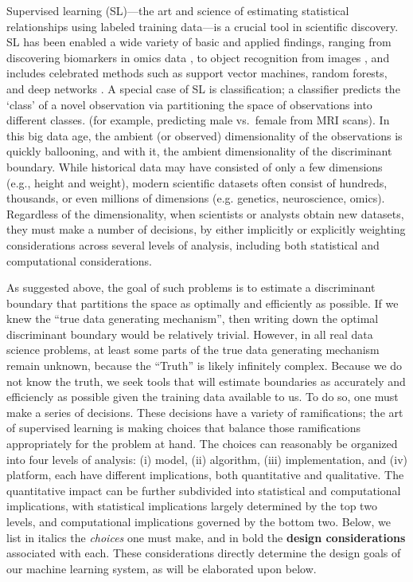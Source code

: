 \documentclass[10pt]{article}
\begin{document}
\vspace{15pt}

\clearpage
\linenumbers


Supervised learning (SL)---the art and science of estimating statistical relationships using labeled training data---is a crucial tool in scientific discovery.  SL has been enabled a wide variety of basic and applied findings, ranging from discovering biomarkers in omics data \cite{Vogelstein2014a}, to object recognition from images \cite{Krizhevsky2012}, and includes celebrated methods such as support vector machines, random forests, and deep networks \cite{Hastie2004}.  A special case of SL is classification; a classifier  predicts the `class' of a novel observation via partitioning the space of observations into different classes.
(for example, predicting male vs.~female from MRI scans).
In this big data age,  the ambient (or observed) dimensionality of the observations is quickly ballooning, and with it, the ambient dimensionality of the discriminant boundary.  While historical data may have consisted of only a few dimensions (e.g., height and weight), modern scientific datasets often consist of hundreds, thousands, or even millions of dimensions (e.g. genetics, neuroscience, omics).
Regardless of the dimensionality, when  scientists or analysts obtain new datasets, they must make a number of decisions, by either implicitly or explicitly weighting considerations across several levels of analysis, including both statistical and computational considerations.

As suggested above, the goal of such problems is to estimate a discriminant boundary that  partitions the space as optimally and efficiently  as possible. If we knew the ``true data generating mechanism'', then writing down the optimal discriminant boundary would be relatively trivial.  However, in all real data science problems, at least some parts of the true data generating mechanism remain unknown, because the ``Truth'' is likely infinitely complex.  Because we do not know the truth, we seek tools that will estimate boundaries as accurately and efficiencly as possible given the training data available to us.  To do so, one must make a series of decisions. These decisions have a variety of ramifications; the art of supervised learning is making choices that balance those ramifications appropriately for the problem at hand.  The choices can reasonably be organized into four levels of analysis: (i) model, (ii) algorithm, (iii) implementation, and (iv) platform, each have different implications, both quantitative and qualitative.  The quantitative impact can be further subdivided into statistical and computational implications, with statistical implications largely determined by the top two levels, and computational implications governed by the bottom two.
Below, we list in italics the \emph{choices} one must make, and in bold the \textbf{design considerations} associated with each.  These considerations directly determine the design goals of our machine learning system, as will be elaborated upon below.
\end{document}
